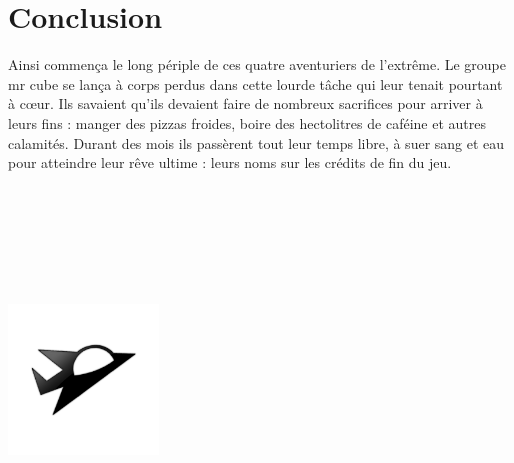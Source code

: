 \documentclass[10pt, titlepage]{report}
\begin{document}
\chapter{Conclusion}

Ainsi commença le long périple de ces quatre aventuriers de l'extrême. Le groupe mr cube se lança à corps perdus dans cette lourde tâche qui leur tenait pourtant à c\oe{}ur. Ils savaient qu'ils devaient faire de nombreux sacrifices pour arriver à leurs fins : manger des pizzas froides, boire des hectolitres de caféine et autres calamités. Durant des mois ils passèrent tout leur temps libre, à suer sang et eau pour atteindre leur rêve ultime : leurs noms sur les crédits de fin du jeu.
\\ \\ \\ \\ \\ \\ \\
\begin{center}
\includegraphics[height=4cm, width=4cm]{vaisseux_petit.png}
\end{center}
\end{document}
